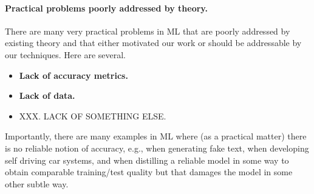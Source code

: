 \paragraph{Practical problems poorly addressed by theory.}
There are many very practical problems in ML that are poorly addressed by existing theory and that either motivated our work or should be addressable by our techniques.
Here are several.
\begin{itemize}
\item
\textbf{Lack of accuracy metrics.}
\item
\textbf{Lack of data.}
\item
XXX. LACK OF SOMETHING ELSE.
\end{itemize}
Importantly, there are many examples in ML where (as a practical matter) there is no reliable notion of accuracy, e.g., when generating fake text, when developing self driving car systems, and when distilling a reliable model in some way to obtain comparable training/test quality but that damages the model in some other subtle way. 
